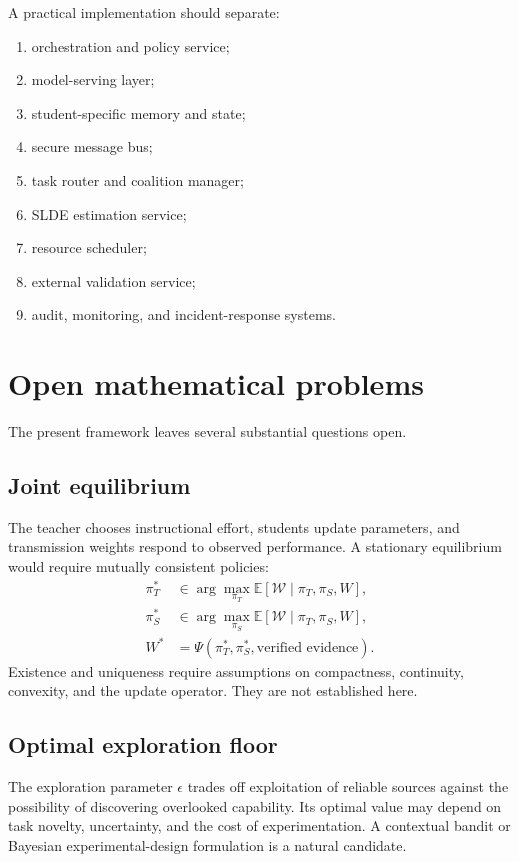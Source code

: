 \documentclass[11pt,a4paper]{article}
\begin{document}
A practical implementation should separate:
\begin{enumerate}
\item orchestration and policy service;
\item model-serving layer;
\item student-specific memory and state;
\item secure message bus;
\item task router and coalition manager;
\item SLDE estimation service;
\item resource scheduler;
\item external validation service;
\item audit, monitoring, and incident-response systems.
\end{enumerate}

\section{Open mathematical problems}

The present framework leaves several substantial questions open.

\subsection{Joint equilibrium}

The teacher chooses instructional effort, students update parameters, and transmission weights respond to observed performance. A stationary equilibrium would require mutually consistent policies:
\begin{align}
\pi_T^*&\in\arg\max_{\pi_T}\mathbb E[\mathcal W\mid\pi_T,\pi_S,W],\\
\pi_S^*&\in\arg\max_{\pi_S}\mathbb E[\mathcal W\mid\pi_T,\pi_S,W],\\
W^*&=\Psi(\pi_T^*,\pi_S^*,\text{verified evidence}).
\end{align}
Existence and uniqueness require assumptions on compactness, continuity, convexity, and the update operator. They are not established here.

\subsection{Optimal exploration floor}

The exploration parameter \(\epsilon\) trades off exploitation of reliable sources against the possibility of discovering overlooked capability. Its optimal value may depend on task novelty, uncertainty, and the cost of experimentation. A contextual bandit or Bayesian experimental-design formulation is a natural candidate.
\end{document}

